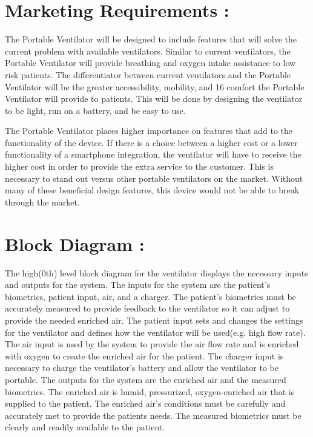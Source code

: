 \documentclass[12pt]{article}
\begin{document}
\clearpage
\section*{Marketing Requirements : }
The Portable Ventilator will be designed to include features that will solve the current
problem with available ventilators. Similar to current ventilators, the Portable Ventilator will
provide breathing and oxygen intake assistance to low risk patients. The differentiator between
current ventilators and the Portable Ventilator will be the greater accessibility, mobility, and
16
comfort the Portable Ventilator will provide to patients. This will be done by designing the
ventilator to be light, run on a battery, and be easy to use.


The Portable Ventilator places higher importance on features that add to the functionality
of the device. If there is a choice between a higher cost or a lower functionality of a smartphone
integration, the ventilator will have to receive the higher cost in order to provide the extra service
to the customer. This is necessary to stand out versus other portable ventilators on the market.
Without many of these beneficial design features, this device would not be able to break through
the market.

\section*{Block Diagram : }
The high(0th) level block diagram for the ventilator displays the necessary inputs and
outputs for the system. The inputs for the system are the patient’s biometrics, patient input, air,
and a charger. The patient’s biometrics must be accurately measured to provide feedback to the
ventilator so it can adjust to provide the needed enriched air. The patient input sets and changes
the settings for the ventilator and defines how the ventilator will be used(e.g. high flow rate). The
air input is used by the system to provide the air flow rate and is enriched with oxygen to create
the enriched air for the patient. The charger input is necessary to charge the ventilator’s battery
and allow the ventilator to be portable. The outputs for the system are the enriched air and the
measured biometrics. The enriched air is humid, pressurized, oxygen-enriched air that is supplied
to the patient. The enriched air’s conditions must be carefully and accurately met to provide the
patients needs. The measured biometrics must be clearly and readily available to the patient.
\end{document}
